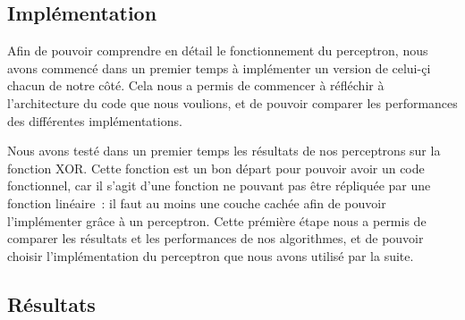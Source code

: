 \newpage


\subsection{Implémentation}

Afin de pouvoir comprendre en détail le fonctionnement du perceptron, nous avons commencé dans un premier temps à implémenter un version 
de celui-çi chacun de notre côté. Cela nous a permis de commencer  à réfléchir à l’architecture du code que nous voulions, et de pouvoir 
comparer les performances des différentes implémentations. 

Nous avons testé dans un premier temps les résultats de nos perceptrons sur la fonction XOR. Cette fonction est un bon départ pour pouvoir 
avoir un code fonctionnel, car il s’agit d’une fonction ne pouvant pas être répliquée par une fonction linéaire : il faut au moins une couche 
cachée afin de pouvoir l’implémenter grâce à un perceptron. 
Cette prémière étape nous a permis de comparer les résultats et les performances de nos algorithmes, et de pouvoir choisir l’implémentation 
du perceptron que nous avons utilisé par la suite.


\subsection{Résultats}


